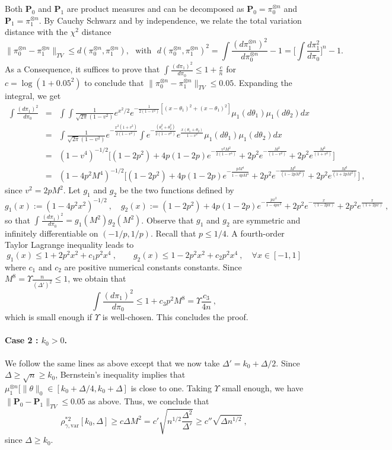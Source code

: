 \documentclass[twoside,11pt]{article}
\def\beqn{\begin{eqnarray*}}
\def\eeqn{\end{eqnarray*}}
\newcommand{\<}{\langle}
\renewcommand{\>}{\rangle}
\begin{document}
Both $\mathbf{P}_0$ and $\mathbf{P}_1$ are product measures and can be decomposed as $\mathbf{P}_0=\pi_0^{\otimes n}$ and $\mathbf{P}_1=\pi_1^{\otimes n}$.
By Cauchy Schwarz and by independence, we relate the total variation distance with the $\chi^2$  distance
$$\|\pi_0^{\otimes n} - \pi_1^{\otimes n}\|_{TV} \leq d(\pi_0^{\otimes n}, \pi_1^{\otimes n}),~~~\text{with}~~~d(\pi_0^{\otimes n}, \pi_1^{\otimes n})^2 = \int \frac{(d\pi_1^{\otimes n})^2}{d\pi_0^{\otimes n}} - 1=\Big[\int \frac{d\pi_1^2}{d\pi_0}\Big]^n - 1 .$$
As a Consequence, it suffices to prove that $\int \frac{(d\pi_1)^2}{d\pi_0}\leq 1+ \frac{c}{n}$ for $c=  \log(1+0.05^2)$ to conclude that $\|\pi_0^{\otimes n} - \pi_1^{\otimes n}\|_{TV}\leq 0.05$.
Expanding the integral, we get
\beqn
\int \frac{(d\pi_1)^2}{d\pi_0}  &=& \int\int     \frac{1}{\sqrt{2\pi}(1-v^2)}e^{x^2/2}e^{-\frac{1}{2(1-v^2)}[(x-\theta_1)^2+(x-\theta_1)^2] }\mu_1(d\theta_1)\mu_1(d \theta_2) dx\\
&=& \int     \frac{1}{\sqrt{2\pi}(1-v^2)}e^{-\frac{x^2(1+v^2)}{2(1-v^2)}}\int e^{-\frac{(\theta_1^2+\theta_2^2)}{2(1-v^2)}}e^{\frac{x(\theta_1+\theta_2)}{1-v^2}} \mu_1(d\theta_1)\mu_1(d \theta_2) dx\\
&=& (1-v^4)^{-1/2}\Big[(1-2p^2)+ 4p(1-2p)e^{-\frac{v^2M^2}{2(1-v^4)}} + 2p^2e^{-\frac{M^2}{(1-v^2)}} + 2p^2e^{\frac{M^2}{(1+v^2)}} \Big]\\
&=& (1-4p^2M^4)^{-1/2}\Big[(1-2p^2)+ 4p(1-2p)e^{-\frac{pM^4}{1-4pM^4}} + 2p^2e^{-\frac{M^2}{(1-2pM^2)}} + 2p^2e^{\frac{M^2}{(1+2pM^2)}} \Big]\ ,
\eeqn
since $v^2=2pM^2$. Let $g_1$ and $g_2$ be the two functions defined by 
$$
 g_1(x):= (1-4p^2x^2)^{-1/2}  \ , \quad g_2(x):=(1-2p^2)+ 4p(1-2p)e^{-\frac{px^2}{1-4px^2}} + 2p^2e^{-\frac{x}{(1-2px)}} + 2p^2e^{\frac{x}{(1+2px)}}\ ,
$$
so that $\int \frac{(d\pi_1)^2}{d\pi_0}= g_1(M^2)g_2(M^2)$. Observe that $g_1$ and $g_2$ are symmetric and infinitely differentiable on $(-1/p,1/p)$. Recall that $p\leq 1/4$. A fourth-order Taylor Lagrange inequality leads to 
\[
 g_1(x)\leq 1 + 2p^2x^2 + c_1 p^2x^4 \ , \quad\quad g_2(x)\leq 1 - 2p^2 x^2 + c_2 p^2 x^4\ , \quad \forall x\in [-1,1]
\]
where $c_1$ and $c_2$ are positive numerical constants constants. Since  $M^8=  \Upsilon \frac{n}{(\Delta')^2}\leq 1$, we obtain that 
\[
 \int \frac{(d\pi_1)^2}{d\pi_0}\leq 1+ c_3 p^2M^8 = \Upsilon \frac{c_3}{4n} \ , 
\]
which is small enough if $\Upsilon$ is well-chosen. This concludes the proof. 


\paragraph{Case 2 : $k_0 >0 $.} We follow the same lines as above except that we now take $\Delta'= k_0 + \Delta/2$. Since $\Delta\geq \sqrt{n}\geq  k_0$,  Bernstein's inequality implies that $\mu_1^{\otimes n}[\|\theta\|_0\in [k_0+\Delta/4,k_0+ \Delta]$ is close to one. Taking $\Upsilon$ small enough, we have $\|\mathbf{P}_0-\mathbf{P}_1\|_{TV}\leq 0.05$ as above. Thus, we conclude that 
\[
 \rho^{*2}_{\gamma,\mathrm{var}}[k_0,\Delta]\geq c \Delta M^2= c' \sqrt{n^{1/2} \frac{\Delta^2}{\Delta'}}\geq c''\sqrt{\Delta n^{1/2}}\ ,
\]
since $\Delta\geq k_0$. 
\end{document}

